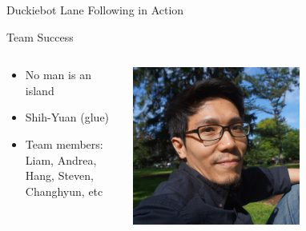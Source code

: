 \documentclass[aspectratio=43]{beamer}
\begin{document}
\begin{frame}{Duckiebot Lane Following in Action}
\begin{center}
\end{center}
\end{frame}


\begin{frame}{Team Success}
\begin{columns}
	\begin{column}{0.55\textwidth}
		\begin{itemize}
			\item No man is an island
			\item \alert{Shih-Yuan} (glue)
\item Team members: Liam, Andrea, Hang, Steven, Changhyun, etc
		\end{itemize}
	\end{column}
	\begin{column}{0.45\textwidth}
		\centering
		\includegraphics[width=0.6\textwidth]{fig/liu.jpg}
	\end{column}
\end{columns}

\end{frame}
\end{document}
